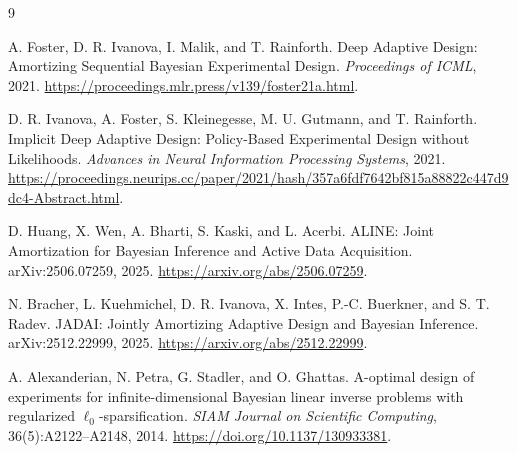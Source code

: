 \documentclass[11pt]{article}
\begin{document}
\begin{thebibliography}{9}

A. Foster, D. R. Ivanova, I. Malik, and T. Rainforth.
Deep Adaptive Design: Amortizing Sequential Bayesian Experimental Design.
\emph{Proceedings of ICML}, 2021.
\url{https://proceedings.mlr.press/v139/foster21a.html}.

D. R. Ivanova, A. Foster, S. Kleinegesse, M. U. Gutmann, and T. Rainforth.
Implicit Deep Adaptive Design: Policy-Based Experimental Design without Likelihoods.
\emph{Advances in Neural Information Processing Systems}, 2021.
\url{https://proceedings.neurips.cc/paper/2021/hash/357a6fdf7642bf815a88822c447d9dc4-Abstract.html}.

D. Huang, X. Wen, A. Bharti, S. Kaski, and L. Acerbi.
ALINE: Joint Amortization for Bayesian Inference and Active Data Acquisition.
arXiv:2506.07259, 2025.
\url{https://arxiv.org/abs/2506.07259}.

N. Bracher, L. Kuehmichel, D. R. Ivanova, X. Intes, P.-C. Buerkner, and S. T. Radev.
JADAI: Jointly Amortizing Adaptive Design and Bayesian Inference.
arXiv:2512.22999, 2025.
\url{https://arxiv.org/abs/2512.22999}.

A. Alexanderian, N. Petra, G. Stadler, and O. Ghattas.
A-optimal design of experiments for infinite-dimensional Bayesian linear inverse
problems with regularized $\ell_0$-sparsification.
\emph{SIAM Journal on Scientific Computing}, 36(5):A2122--A2148, 2014.
\url{https://doi.org/10.1137/130933381}.

\end{thebibliography}
\end{document}
